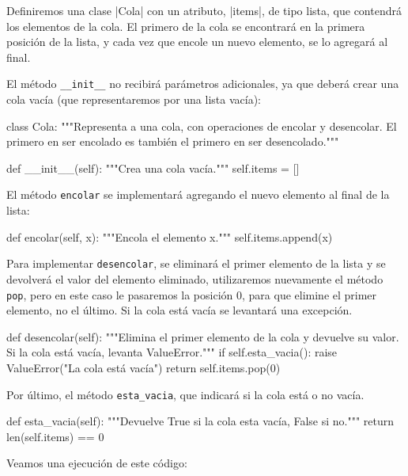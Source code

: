 Definiremos una clase |Cola| con un atributo, |items|, de tipo
lista, que contendrá los elementos de la cola. El primero de la cola se
encontrará en la primera posición de la lista, y cada vez que encole un
nuevo elemento, se lo agregará al final.

El método \lstinline+__init__+ no recibirá parámetros adicionales, ya que
deberá crear una cola vacía (que representaremos por una lista vacía):

\begin{codigo-python-sn}
class Cola:
    """Representa a una cola, con operaciones de encolar y
       desencolar. El primero en ser encolado es también el primero
       en ser desencolado."""

    def __init__(self):
        """Crea una cola vacía."""
        self.items = []
\end{codigo-python-sn}

El método \lstinline!encolar! se implementará agregando el nuevo elemento
al final de la lista:

\begin{codigo-python-sn}
    def encolar(self, x):
        """Encola el elemento x."""
        self.items.append(x)
\end{codigo-python-sn}

Para implementar \lstinline!desencolar!, se eliminará el primer elemento de
la lista y se devolverá el valor del elemento eliminado, utilizaremos
nuevamente el método \lstinline!pop!, pero en este caso le pasaremos la
posición $0$, para que elimine el primer elemento, no el último. Si la cola
está vacía se levantará una excepción.

\begin{codigo-python-sn}
    def desencolar(self):
        """Elimina el primer elemento de la cola y devuelve su
           valor. Si la cola está vacía, levanta ValueError."""
        if self.esta_vacia():
            raise ValueError("La cola está vacía")
        return self.items.pop(0)
\end{codigo-python-sn}

Por último, el método \lstinline!esta_vacia!, que indicará si la cola está
o no vacía.

\begin{codigo-python-sn}
    def esta_vacia(self):
        """Devuelve True si la cola esta vacía, False si no."""
        return len(self.items) == 0
\end{codigo-python-sn}

Veamos una ejecución de este código:

